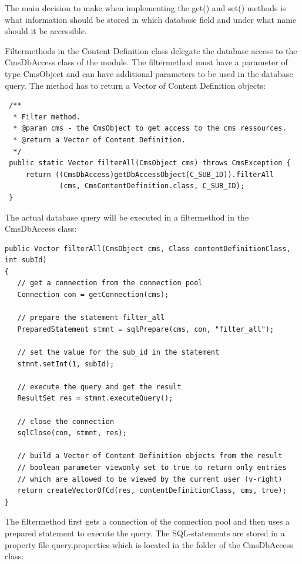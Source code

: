 The main decision to make when implementing the {\meth get()} and {\meth set()}
methods is what information should be stored in which database field 
and under what name should it be accessible. 

Filtermethods in the Content Definition class delegate the database access
to the {\class CmsDbAccess} class of the module. The filtermethod must have a parameter
of type {\class CmsObject} and can have additional parameters to be used in the database query.
The method has to return a Vector of Content Definition objects:

\begin{verbatim}
 /**
  * Filter method.
  * @param cms - the CmsObject to get access to the cms ressources.
  * @return a Vector of Content Definition.
  */
 public static Vector filterAll(CmsObject cms) throws CmsException {
     return ((CmsDbAccess)getDbAccessObject(C_SUB_ID)).filterAll
             (cms, CmsContentDefinition.class, C_SUB_ID);
 }
\end{verbatim}


The actual database query will be executed in a filtermethod in the {\class CmsDbAccess} class:

\begin{verbatim}
public Vector filterAll(CmsObject cms, Class contentDefinitionClass, int subId)
{
   // get a connection from the connection pool
   Connection con = getConnection(cms);
   
   // prepare the statement filter_all
   PreparedStatement stmnt = sqlPrepare(cms, con, "filter_all");
   
   // set the value for the sub_id in the statement
   stmnt.setInt(1, subId);
   
   // execute the query and get the result
   ResultSet res = stmnt.executeQuery();
   
   // close the connection   
   sqlClose(con, stmnt, res);
   
   // build a Vector of Content Definition objects from the result
   // boolean parameter viewonly set to true to return only entries 
   // which are allowed to be viewed by the current user (v-right)
   return createVectorOfCd(res, contentDefinitionClass, cms, true);
}
\end{verbatim}

The filtermethod first gets a connection of the connection pool and then uses a prepared
statement to execute the query.
The SQL-statements are stored in a property file query.properties which is located in the folder of
the {\class CmsDbAccess} class:

